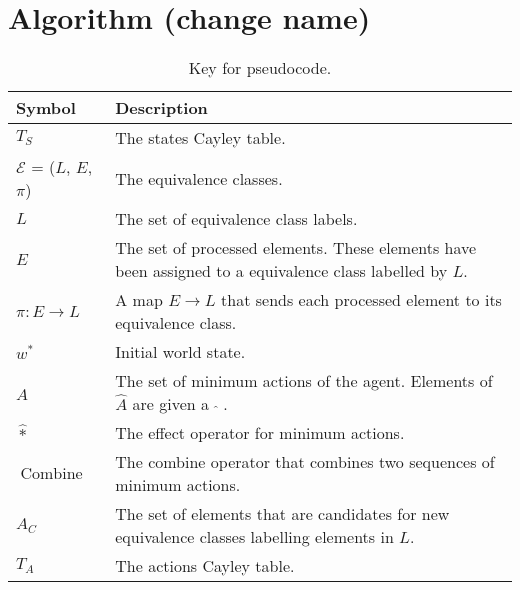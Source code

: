 \chapter{Algorithm (change name)}
\begin{table*}
	\centering
	\begin{tabularx}{\textwidth}{@{}lX@{}}
		\toprule
		\textbf{Symbol}                         & \textbf{Description}                                                                                     \\
		\midrule
		$T_{S}$                                 & The states Cayley table.                                                                                 \\
		$\mathcal{E}$ = ($L$, \; $E$, \; $\pi$) & The equivalence classes.                                                                                 \\
		$L$                                     & The set of equivalence class labels.                                                                     \\
		$E$                                     & The set of processed elements. These elements have been assigned to a equivalence class labelled by $L$. \\
		$\pi: E \to L$                          & A map $E \to L$ that sends each processed element to its equivalence class.                              \\
		$w^{*}$                                 & Initial world state.                                                                                     \\
		$\hat{A}$                               & The set of minimum actions of the agent. Elements of $\hat{A}$ are given a $\; \hat{ } \;$.              \\
		$\hat{*}$                               & The effect operator for minimum actions.                                                                 \\
		$\operatorname{Combine}$                & The combine operator that combines two sequences of minimum actions.                                     \\
		$A_{C}$                                 & The set of elements that are candidates for new equivalence classes labelling elements in $L$.           \\
		$T_{A}$                                 & The actions Cayley table.                                                                                \\
		\bottomrule
	\end{tabularx}
	\caption{Key for pseudocode.}
	\label{tab:pseudocode_key}
\end{table*}



